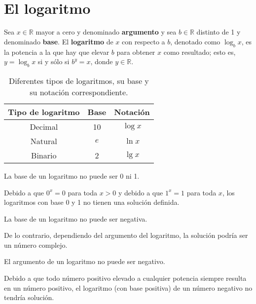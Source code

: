\chapter{El logaritmo}

Sea \(x\in\mathbb{R}\) mayor a cero y denominado \textbf{argumento} y sea \(b\in\mathbb{R}\) distinto de 1 y denominado \textbf{base}.
El \textbf{logaritmo} de \(x\) con respecto a \(b\), denotado como \(\log_{b}x\), es la potencia a la que hay que elevar \(b\) para obtener \(x\) como resultado; esto es, \(y=\log_{b}x\) si y sólo si \(b^{y}=x\), donde \(y\in\mathbb{R}\).

\begin{table}[h]
  \caption{Diferentes tipos de logaritmos, su base y su notación correspondiente.}
  \begin{center}
    \begin{tabular}{ccc}
      \toprule
      Tipo de logaritmo & Base & Notación \\
      \midrule
      Decimal & 10 & \(\log{x}\) \\
      Natural & \(e\) & \(\ln{x}\) \\
      Binario & 2 & \(\lg{x}\) \\
      \bottomrule
    \end{tabular}
  \end{center}
\end{table}

\begin{prop}
  La base de un logaritmo no puede ser 0 ni 1.
\end{prop}
  
Debido a que \(0^x=0\) para toda \(x>0\) y debido a que \(1^x=1\) para toda \(x\), los logaritmos con base 0 y 1 no tienen una solución definida.

\begin{prop}
  La base de un logaritmo no puede ser negativa.
\end{prop}

De lo contrario, dependiendo del argumento del logaritmo, la solución podría ser un número complejo.

\begin{prop}
  El argumento de un logaritmo no puede ser negativo.
\end{prop}

Debido a que todo número positivo elevado a cualquier potencia siempre resulta en un número positivo, el logaritmo (con base positiva) de un número negativo no tendría solución.

